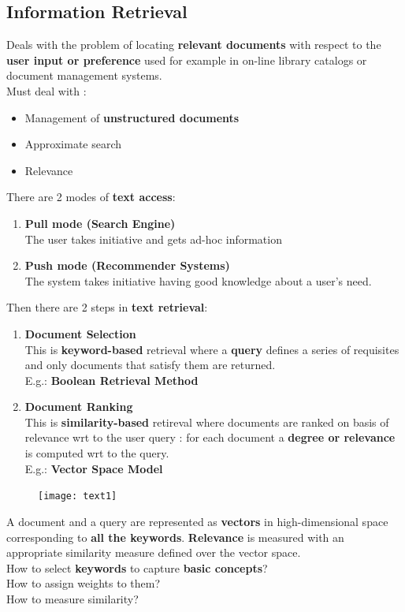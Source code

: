 \subsection{Information Retrieval}
Deals with the problem of locating \textbf{relevant documents} with respect to the \textbf{user input or preference} used for example in on-line library catalogs or document management systems.\\
Must deal with :
\begin{itemize}
\item Management of \textbf{unstructured documents}
\item Approximate search
\item Relevance
\end{itemize}

There are 2 modes of \textbf{text access}:
\begin{enumerate}
\item \textbf{Pull mode (Search Engine)}\\
The user takes initiative and gets ad-hoc information
\item \textbf{Push mode (Recommender Systems)}\\
The system takes initiative having good knowledge about a user's need.
\end{enumerate}

Then there are 2 steps in \textbf{text retrieval}:
\begin{enumerate}
\item \textbf{Document Selection}\\
This is \textbf{keyword-based } retrieval where a \textbf{query} defines a series of requisites and only documents that satisfy them are returned. \\E.g.: \textbf{Boolean Retrieval Method}
\item \textbf{Document Ranking}\\
This is \textbf{similarity-based} retireval where documents are ranked on basis of relevance wrt to the user query : for each document a  \textbf{degree or relevance} is computed wrt to the query.\\E.g.: \textbf{Vector Space Model}
\end{enumerate}

\begin{figure}[H]
  \centering
  \texttt{[image: text1]}
\end{figure}

A document and a query are represented as \textbf{vectors} in high-dimensional space corresponding to\textbf{ all the keywords}. \textbf{Relevance} is measured with an appropriate similarity measure defined over the vector space.
\\
How to select \textbf{keywords} to capture \textbf{basic concepts}?\\
How to assign weights to them?\\
How to measure similarity?\\

